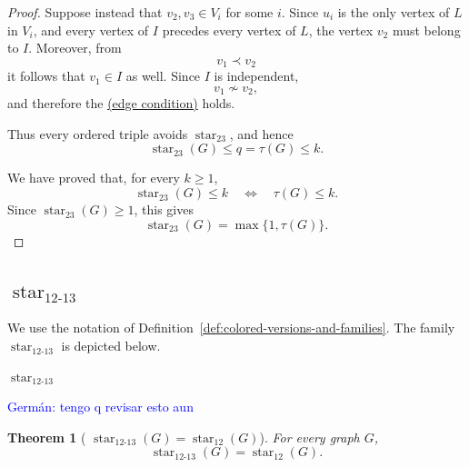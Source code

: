 \documentclass[12pt]{article}
\theoremstyle{plain}
\newtheorem{theorem}{Theorem}[section]
\theoremstyle{definition}
\theoremstyle{remark}
\theoremstyle{definition}
\newcommand{\edgecondition}{%
  \hyperref[def:avoid:cond:edge]{(edge condition)}\xspace
}
\newcommand{\starlabel}{\mathrm{star}}
\DeclareRobustCommand{\starparam}[1]{%
  \ensuremath{\mathop{\starlabel}\nolimits_{#1}}%
}
\newcommand{\german}[1]{%
  \textcolor{blue}{Germán: #1}%
}
\begin{document}
\begin{proof}
Suppose instead that \(v_2,v_3\in V_i\) for some \(i\). Since \(u_i\) is
the only vertex of \(L\) in \(V_i\), and every vertex of \(I\) precedes
every vertex of \(L\), the vertex \(v_2\) must belong to \(I\). Moreover,
from
\[
v_1\prec v_2
\]
it follows that \(v_1\in I\) as well. Since \(I\) is independent,
\[
v_1\not\sim v_2,
\]
and therefore the \edgecondition{} holds.

Thus every ordered triple avoids \(\starparam{23}\), and hence
\[
\starparam{23}(G)\le q=\tau(G)\le k.
\]

We have proved that, for every \(k\ge1\),
\[
\starparam{23}(G)\le k
\quad\Longleftrightarrow\quad
\tau(G)\le k.
\]
Since \(\starparam{23}(G)\ge1\), this gives
\[
\starparam{23}(G)=\max\{1,\tau(G)\}.
\]
\end{proof}






\subsection{\texorpdfstring{\(\starparam{12\text{-}13}\)}{star12-13}}
\label{subsec:star12-13}

We use the notation of
Definition~\ref{def:colored-versions-and-families}.
The family \(\starparam{12\text{-}13}\) is depicted below.

\begin{center}

\smallskip
\(\starparam{12\text{-}13}\)
\end{center}






\german{tengo q revisar esto aun}
\begin{theorem}[
\texorpdfstring{
\(\starparam{12\text{-}13}(G)=\starparam{12}(G)\)}
{star12-13(G) = star12(G)}
]
\label{thm:star12-13-equals-star12}
For every graph \(G\),
\[
\starparam{12\text{-}13}(G)
=
\starparam{12}(G).
\]
\end{theorem}
\end{document}
